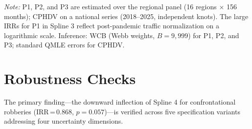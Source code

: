 \documentclass[pdflatex,sn-basic]{sn-jnl}
\newcommand{\tablenote}[1]{%
  \vspace{2pt}%
  {\par\footnotesize\textit{Note:} #1\par}%
}
\begin{document}
\begin{table}[htbp]
\centering
\caption{Placebos and external validation: Poisson-QMLE models}
\label{tab:placebos}
\footnotesize
{}
\tablenote{P1, P2, and P3 are estimated over the regional panel (16 regions $\times$ 156 months); CPHDV on a national series (2018--2025, independent knots). The large IRRs for P1 in Spline 3 reflect post-pandemic traffic normalization on a logarithmic scale. Inference: WCB (Webb weights, $B=9,999$) for P1, P2, and P3; standard QMLE errors for CPHDV.}
\end{table}

\section{Robustness Checks}
\label{sec:robustez}

The primary finding---the downward inflection of Spline 4 for confrontational robberies (IRR\,=\,0.868, $p=0.057$)---is verified across five specification variants addressing four uncertainty dimensions.
\end{document}
